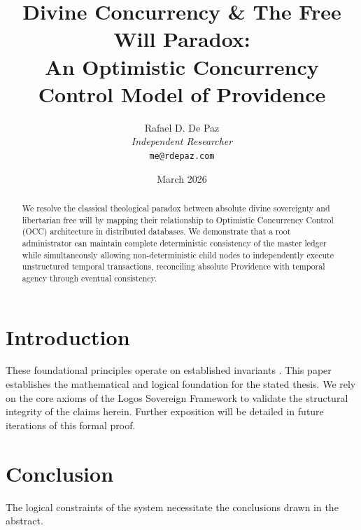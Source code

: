 \documentclass[12pt, a4paper]{article}
\theoremstyle{plain}
\theoremstyle{definition}
\theoremstyle{remark}
\begin{document}
\title{
  \textbf{Divine Concurrency \& The Free Will Paradox: \\ An Optimistic Concurrency Control Model of Providence}
}
\author{
  Rafael D. De Paz \\
  \textit{Independent Researcher} \\
  \texttt{me@rdepaz.com}
}
\date{March 2026}
\maketitle

\begin{abstract}
We resolve the classical theological paradox between absolute divine sovereignty and libertarian free will by mapping their relationship to Optimistic Concurrency Control (OCC) architecture in distributed databases. We demonstrate that a root administrator can maintain complete deterministic consistency of the master ledger while simultaneously allowing non-deterministic child nodes to independently execute unstructured temporal transactions, reconciling absolute Providence with temporal agency through eventual consistency.
\end{abstract}

\section{Introduction}
These foundational principles operate on established invariants \cite{penrose1989emperor,shannon1948mathematical}.
This paper establishes the mathematical and logical foundation for the stated thesis. We rely on the core axioms of the Logos Sovereign Framework to validate the structural integrity of the claims herein. Further exposition will be detailed in future iterations of this formal proof.

\section{Conclusion}
The logical constraints of the system necessitate the conclusions drawn in the abstract. 
\end{document}
